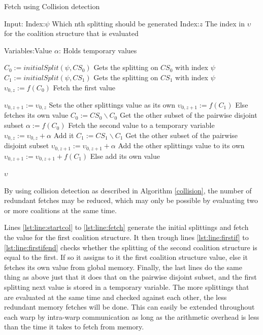 \documentclass{llncs}
\begin{document}
\begin{algorithm}[htbp]
\caption{Fetch using Collision detection \label{collision}}
Input:
Index:$\psi$ \hfill Which nth splitting should be generated
Index:$z$ \hfill The index in $\upsilon$ for the coalition structure that is evaluated 

Variables:Value $\alpha $: \hfill Holds temporary values

\begin{algorithmic}[1]
    \STATE $C_{0} := initialSplit(\psi,CS_0)$ \label{lst:line:startcol} \hfill Gets the splitting on $CS_0$ with index $\psi$
    \STATE $C_{1} := initialSplit(\psi,CS_1)$ \hfill Gets the splitting on $CS_1$ with index $\psi$
    \STATE $\upsilon_{0,z} := f(C_{0})$ \label{lst:line:fetch} \hfill Fetch the first value
    
     \label{lst:line:firstif} 
      \STATE $\upsilon_{0,z+1} := \upsilon_{0,z}$ \hfill Sets the other splittings value as its own
      \ELSE
      \STATE $\upsilon_{0,z+1} := f(C_{1})$ \hfill Else fetches its own value
     \ENDIF \label{lst:line:firstifend}
    \STATE $C_{0} := CS_0\backslash C_{0}$ \label{lst:line:startend} \hfill Get the other subset of the pairwise disjoint subset
    \STATE $\alpha := f(C_{0})$ \hfill Fetch the second value to a temporary variable
    \STATE $\upsilon_{0,z} := \upsilon_{0,z}  + \alpha$ \label{lst:line:endend} \hfill Add it
    \STATE $C_{1} := CS_1\backslash C_{1}$ \hfill Get the other subset of the pairwise disjoint subset
      \STATE $\upsilon_{0,z+1} := \upsilon_{0,z+1}  + \alpha$ \hfill Add the other splittings value to its own
    \ELSE
      \STATE $\upsilon_{0,z+1} := \upsilon_{0,z+1} + f(C_{1})$ \hfill Else add its own value
    \ENDIF
    
\RETURN $\upsilon$
\end{algorithmic}
\end{algorithm}
By using collision detection as described in Algorithm \ref{collision}, the number of redundant fetches may be reduced,
which may only be possible by evaluating two or more coalitions at the same time. 

Lines \ref{lst:line:startcol} to \ref{lst:line:fetch} generate
the initial splittings and fetch the value for the first coalition structure. It then trough lines \ref{lst:line:firstif} to \ref{lst:line:firstifend}
checks whether the splitting of the second coalition structure is equal to the first. 
If so it assigns to it the first coalition structure value, else it fetches its own value from global memory. 
Finally, the last lines do the same thing as above just that it does that on the pairwise disjoint subset, 
and the first splitting next value is stored in a temporary variable. 
The more splittings that are evaluated at the same time and checked against each other, the less redundant memory fetches will be done. This can easily be extended throughout each warp by intra-warp communication as long as the arithmetic overhead is less than the time it takes to fetch from memory. 
\end{document}

